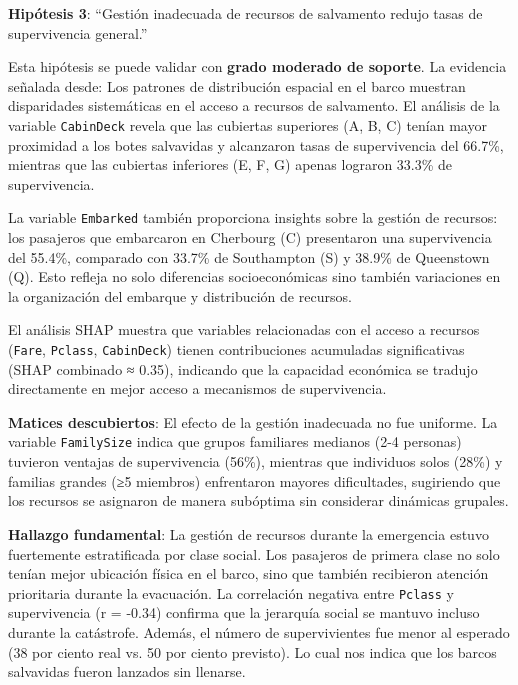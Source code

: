 \documentclass[conference]{IEEEtran}
\begin{document}
\vspace{.2 cm}

\textbf{Hipótesis 3}: ``Gestión inadecuada de recursos de salvamento redujo tasas de supervivencia general.''

Esta hipótesis se puede validar con \textbf{grado moderado de soporte}. La evidencia señalada desde: Los patrones de distribución espacial en el barco muestran disparidades sistemáticas en el acceso a recursos de salvamento. El análisis de la variable \texttt{CabinDeck} revela que las cubiertas superiores (A, B, C) tenían mayor proximidad a los botes salvavidas y alcanzaron tasas de supervivencia del 66.7\%, mientras que las cubiertas inferiores (E, F, G) apenas lograron 33.3\% de supervivencia. 

La variable \texttt{Embarked} también proporciona insights sobre la gestión de recursos: los pasajeros que embarcaron en Cherbourg (C) presentaron una supervivencia del 55.4\%, comparado con 33.7\% de Southampton (S) y 38.9\% de Queenstown (Q). Esto refleja no solo diferencias socioeconómicas sino también variaciones en la organización del embarque y distribución de recursos.

El análisis SHAP muestra que variables relacionadas con el acceso a recursos (\texttt{Fare}, \texttt{Pclass}, \texttt{CabinDeck}) tienen contribuciones acumuladas significativas (SHAP combinado ≈ 0.35), indicando que la capacidad económica se tradujo directamente en mejor acceso a mecanismos de supervivencia.

\textbf{Matices descubiertos}: El efecto de la gestión inadecuada no fue uniforme. La variable \texttt{FamilySize} indica que grupos familiares medianos (2-4 personas) tuvieron ventajas de supervivencia (56\%), mientras que individuos solos (28\%) y familias grandes (≥5 miembros) enfrentaron mayores dificultades, sugiriendo que los recursos se asignaron de manera subóptima sin considerar dinámicas grupales.

\textbf{Hallazgo fundamental}: La gestión de recursos durante la emergencia estuvo fuertemente estratificada por clase social. Los pasajeros de primera clase no solo tenían mejor ubicación física en el barco, sino que también recibieron atención prioritaria durante la evacuación. La correlación negativa entre \texttt{Pclass} y supervivencia (r = -0.34) confirma que la jerarquía social se mantuvo incluso durante la catástrofe. Además, el número de supervivientes fue menor al esperado (38 por ciento real vs. 50 por ciento previsto). Lo cual nos indica que los barcos salvavidas fueron lanzados sin llenarse.
\end{document}

